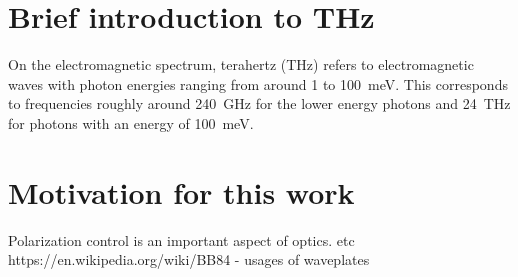 \section{Brief introduction to THz}
On the electromagnetic spectrum, terahertz (THz) refers to electromagnetic waves with photon energies ranging from around 1 to \SI{100}{\milli \electronvolt}. This corresponds to frequencies roughly around \SI{240}{\giga \hertz} for the lower energy photons and \SI{24}{\tera \hertz} for photons with an energy of \SI{100}{\milli \electronvolt}.


\section{Motivation for this work}
Polarization control is an important aspect of optics. etc https://en.wikipedia.org/wiki/BB84
- usages of waveplates

